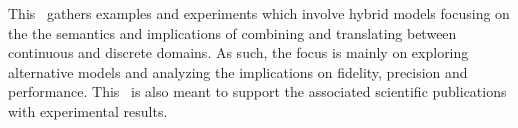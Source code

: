 This \SelfRef\ gathers examples and experiments which involve hybrid models focusing on the the semantics and implications of combining and translating between continuous and discrete domains. As such, the focus is mainly on exploring alternative models and analyzing the implications on fidelity, precision and performance. This \SelfRef\ is also meant to support the associated scientific publications with experimental results.